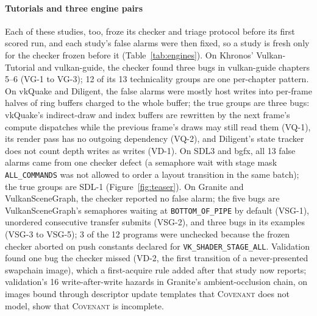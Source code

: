 \documentclass[acmtog,anonymous,review]{acmart}
\newcommand{\sys}{\textsc{Covenant}\xspace}
\newcommand{\code}[1]{\texttt{#1}}
\begin{document}
\paragraph{Tutorials and three engine pairs}
\label{sec:eval-engine}
Each of these studies, too, froze its checker and triage protocol before its first scored run, and each study's false
alarms were then fixed, so a study is fresh only for the checker frozen before it (Table~\ref{tab:engines}).
On Khronos' Vulkan-Tutorial and vulkan-guide, the checker found three bugs in vulkan-guide chapters 5--6 (VG-1 to VG-3); 12 of
its 13 technicality groups are one per-chapter pattern. On vkQuake and Diligent, the false alarms were mostly host
writes into per-frame halves of ring buffers charged to the whole buffer; the true groups are three bugs: vkQuake's
indirect-draw and index buffers are rewritten by the next frame's compute dispatches while the previous frame's draws
may still read them (VQ-1), its render pass has no outgoing dependency (VQ-2), and Diligent's state tracker does not
count depth writes as writes (VD-1). On SDL3 and bgfx, all 13 false alarms came from one checker defect (a semaphore
wait with stage mask \code{ALL\_COMMANDS} was not allowed to order a layout transition in the same batch); the true
groups are SDL-1 (Figure~\ref{fig:teaser}). On Granite and VulkanSceneGraph, the checker reported no false alarm; the five bugs
are VulkanSceneGraph's semaphores waiting at \code{BOTTOM\_OF\_PIPE} by default (VSG-1), unordered consecutive transfer
submits (VSG-2), and three bugs in its examples (VSG-3 to VSG-5); 3 of the 12 programs were unchecked because the
frozen checker aborted on push constants declared for \code{VK\_SHADER\_STAGE\_ALL}. Validation found one bug the
checker missed (VD-2, the first transition of a never-presented swapchain image), which a first-acquire rule added
after that study now reports; validation's 16
write-after-write hazards in Granite's ambient-occlusion chain, on images bound through descriptor update templates
that \sys does not model, show that \sys is incomplete.
\end{document}
